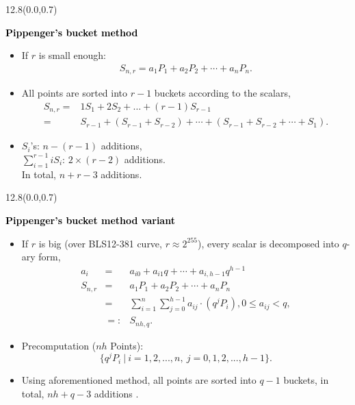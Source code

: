 \documentclass{beamer}                  %
\newcommand{\UW}[1]{\textbf{\textcolor{black}{#1}}}
\newcommand{\UWtitle}[1]{
	\begin{textblock}{12.8}(0.0,0.7)
		\begin{center} 
			\textbf{\UW{\Large{#1}}}
		\end{center}
	\end{textblock}
}
\newcommand{\fillframe}{\vspace*{10cm}}
\begin{document}
\begin{frame}
	\UWtitle{Pippenger's bucket method}
	\vspace*{1.5cm}
			\begin{itemize}	
				\item If $r$ is small enough:
				\begin{eqnarray*}
				S_{n,r}= a_1P_1+a_2P_2+\cdots + a_nP_n.
				\end{eqnarray*}
				
				\item All points are sorted into $r-1$ buckets according to the scalars,
				\begin{equation*}
				\begin{aligned}
				S_{n,r}=& 1 S_{1}+2 S_{2}+\ldots+(r-1) S_{r-1}\\
				=& S_{r-1} + (S_{r-1}+S_{r-2})+\cdots +(S_{r-1}+S_{r-2}+\cdots +S_1).
				\end{aligned}
				\end{equation*}
				
				\item $S_i$'s: $n - (r -1)$ additions,\\
				$\sum_{i = 1}^{r-1} iS_i$: $2\times (r-2)$ additions.\\
				In total, $n+r -3$ additions.	
			\end{itemize}
	\fillframe
\end{frame}

\begin{frame}
	\UWtitle{Pippenger's bucket method variant}
	\vspace*{1.5cm}
			\begin{itemize}	
				\item<1-> If $r$ is big (over BLS12-381 curve, $r\approx 2^{255}$), every scalar is decomposed into $q$-ary form,
				\begin{eqnarray*}
				a_i &=& a_{i0} + a_{i1}q +\cdots+ a_{i,h-1}q^{h-1} \\
				S_{n,r}&=& a_1P_1+a_2P_2+\cdots + a_nP_n\\
				&=&\sum _{i=1}^n\sum_{j=0}^{h-1}a_{ij}\cdot (q^{j}P_i), 0 \le a_{ij}< q,\\
				& =: & S_{nh,q}.
				\end{eqnarray*}
				
				\item<2-> Precomputation ($nh$ Points):
				\begin{equation*}
				\{q^{j}P_i\ |\ i= 1,2,...,n,\ j=0,1,2,...,h-1\}. 
				\end{equation*}
				
				\item<2-> Using aforementioned method, all points are sorted into $q-1$ buckets,
				in total, $nh+ q -3$ additions \cite{brickell1995fast}.	
			\end{itemize}
	\fillframe
\end{frame}
\end{document}
